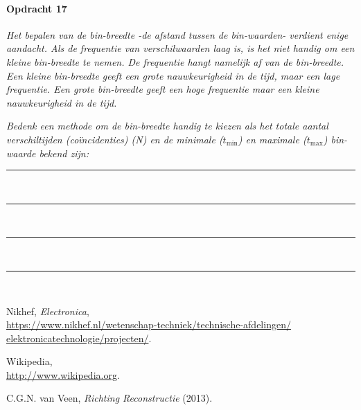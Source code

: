 \bigskip{}


\begin{minipage}[t]{1\columnwidth}

\paragraph{Opdracht 17}

\textit{Het bepalen van de bin-breedte -de afstand tussen de bin-waarden-
verdient enige aandacht. Als de frequentie van verschilwaarden laag
is, is het niet handig om een kleine bin-breedte te nemen. De frequentie
hangt namelijk af van de bin-breedte. Een kleine bin-breedte geeft
een grote nauwkeurigheid in de tijd, maar een lage frequentie. Een
grote bin-breedte geeft een hoge frequentie maar een kleine nauwkeurigheid
in de tijd.}

\textit{Bedenk een methode om de bin-breedte handig te kiezen als
het totale aantal verschiltijden (coïncidenties) (N) en de minimale
($t_\textrm{min}$) en maximale ($t_\textrm{max}$) bin-waarde bekend zijn:}

\begin{center}
    \rule{\textwidth}{0.3mm}\\
    \rule{\textwidth}{0.3mm}\\
    \rule{\textwidth}{0.3mm}\\
    \rule{\textwidth}{0.3mm}\\
\end{center}
\end{minipage}


\begin{thebibliography}{9}
     Nikhef, \emph{\hisparc Electronica},\\
    \url{https://www.nikhef.nl/wetenschap-techniek/technische-afdelingen/
         elektronicatechnologie/projecten/}.

     Wikipedia, \\
    \url{http://www.wikipedia.org}.

     C.G.N. van Veen, \emph{Richting
    Reconstructie} (2013).
\end{thebibliography}


